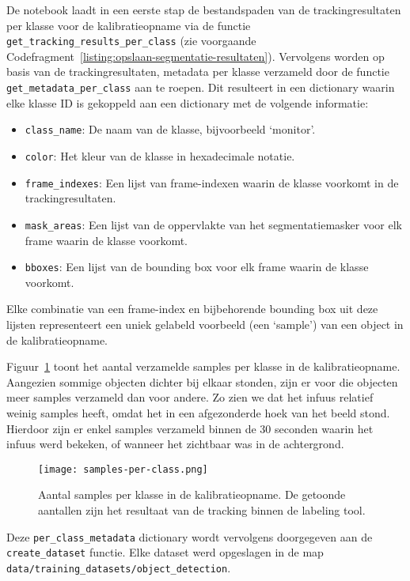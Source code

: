 De notebook laadt in een eerste stap de bestandspaden van de trackingresultaten per klasse 
voor de kalibratieopname via de functie \texttt{get\_tracking\_results\_per\_class} (zie voorgaande Codefragment~\ref{listing:opslaan-segmentatie-resultaten}).
Vervolgens worden op basis van de trackingresultaten, metadata per klasse verzameld door de functie \texttt{get\_metadata\_per\_class} aan te roepen.
Dit resulteert in een dictionary waarin elke klasse ID is gekoppeld aan een dictionary met de volgende informatie:
\begin{itemize}
    \item \texttt{class\_name}: De naam van de klasse, bijvoorbeeld `monitor'.
    \item \texttt{color}: Het kleur van de klasse in hexadecimale notatie.
    \item \texttt{frame\_indexes}: Een lijst van frame-indexen waarin de klasse voorkomt in de trackingresultaten.
    \item \texttt{mask\_areas}: Een lijst van de oppervlakte van het segmentatiemasker voor elk frame waarin de klasse voorkomt.
    \item \texttt{bboxes}: Een lijst van de bounding box voor elk frame waarin de klasse voorkomt.
\end{itemize}
Elke combinatie van een frame-index en bijbehorende bounding box uit deze lijsten representeert 
een uniek gelabeld voorbeeld (een `sample') van een object in de kalibratieopname.

Figuur~\ref{fig:samples-per-class} toont het aantal verzamelde samples per klasse in de kalibratieopname. 
Aangezien sommige objecten dichter bij elkaar stonden, 
zijn er voor die objecten meer samples verzameld dan voor andere.
Zo zien we dat het infuus relatief weinig samples heeft, omdat het in een afgezonderde hoek van het beeld stond.
Hierdoor zijn er enkel samples verzameld binnen de 30 seconden waarin het infuus werd bekeken, 
of wanneer het zichtbaar was in de achtergrond.

\begin{figure}[H]
    \centering
    \texttt{[image: samples-per-class.png]}
    \caption[Aantal samples per klasse in de kalibratieopname]{
        \label{fig:samples-per-class}
        Aantal samples per klasse in de kalibratieopname.
        De getoonde aantallen zijn het resultaat van de tracking binnen de labeling tool.
      }
\end{figure}

Deze \texttt{per\_class\_metadata} dictionary wordt vervolgens doorgegeven aan de \texttt{create\_dataset} functie.
Elke dataset werd opgeslagen in de map \texttt{data/training\_datasets/object\_detection}.

